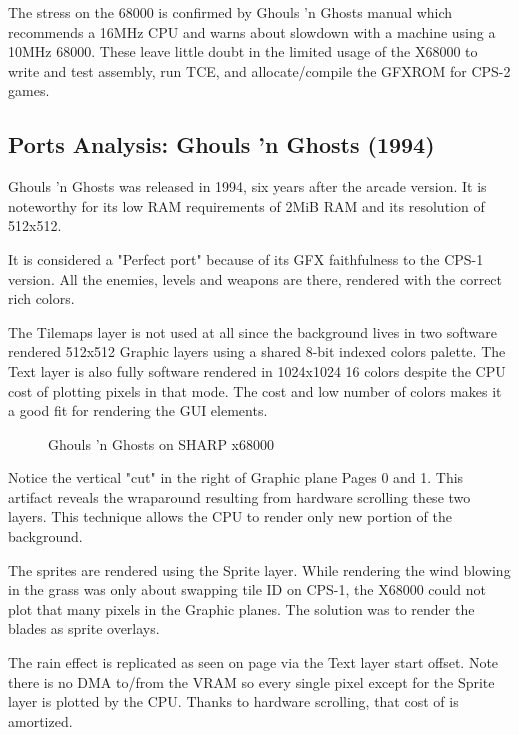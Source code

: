 The stress on the 68000 is confirmed by Ghouls 'n Ghosts manual which recommends a 16MHz CPU and warns about slowdown with a machine using a 10MHz 68000. These leave little doubt in the limited usage of the X68000 to write and test assembly, run TCE, and allocate/compile the GFXROM for CPS-2 games.



\subsection{Ports Analysis: Ghouls 'n Ghosts (1994)}
Ghouls 'n Ghosts was released in 1994, six years after the arcade version. It is noteworthy for its low RAM requirements of 2MiB RAM and its resolution of 512x512.

It is considered a "Perfect port" because of its GFX faithfulness to the CPS-1 version. All the enemies, levels and weapons are there, rendered with the correct rich colors. 

The Tilemaps layer is not used at all since the background lives in two software rendered 512x512 Graphic layers using a shared 8-bit indexed colors palette. The Text layer is also fully software rendered in 1024x1024 16 colors despite the CPU cost of plotting pixels in that mode. The cost and low number of colors makes it a good fit for rendering the GUI elements.

\begin{figure}[H]
\caption*{Ghouls 'n Ghosts on SHARP x68000}
\end{figure}


Notice the vertical "cut" in the right of Graphic plane Pages 0 and 1. This artifact reveals the wraparound resulting from hardware scrolling these two layers. This technique allows the CPU to render only new portion of the background. 

The sprites are rendered using the Sprite layer. While rendering the wind blowing in the grass was only about swapping tile ID on CPS-1, the X68000 could not plot that many pixels in the Graphic planes. The solution was to render the blades as sprite overlays.

The rain effect is replicated as seen on page \pageref{gg_rain} via the Text layer start offset. Note there is no DMA to/from the VRAM so every single pixel except for the Sprite layer is plotted by the CPU. Thanks to hardware scrolling, that cost of is amortized.

